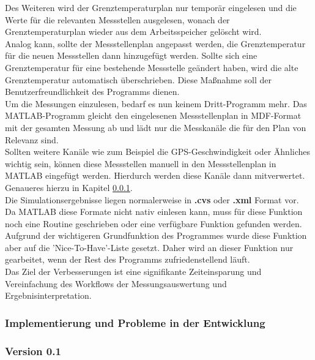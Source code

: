 Des Weiteren wird der Grenztemperaturplan nur temporär eingelesen und die Werte für die relevanten Messstellen ausgelesen, wonach der Grenztemperaturplan wieder aus dem Arbeitsspeicher gelöscht wird. \\
Analog kann, sollte der Messstellenplan angepasst werden, die Grenztemperatur für die neuen Messstellen dann hinzugefügt werden. Sollte sich eine Grenztemperatur für eine bestehende Messstelle geändert haben, wird die alte Grenztemperatur automatisch überschrieben. Diese Maßnahme soll der Benutzerfreundlichkeit des Programms dienen. \\

Um die Messungen einzulesen, bedarf es nun keinem Dritt-Programm mehr. Das MATLAB-Programm gleicht den eingelesenen Messstellenplan in MDF-Format mit der gesamten Messung ab und lädt nur die Messkanäle die für den Plan von Relevanz sind.\\
Sollten weitere Kanäle wie zum Beispiel die GPS-Geschwindigkeit oder Ähnliches wichtig sein, können diese Messstellen manuell in den Messstellenplan in MATLAB eingefügt werden. Hierdurch werden diese Kanäle dann mitverwertet. \\
Genaueres hierzu in Kapitel \ref{Implementierung}.\\

Die Simulationsergebnisse liegen normalerweise in \textbf{.cvs} oder \textbf{.xml} Format vor. \\
Da MATLAB diese Formate nicht nativ einlesen kann, muss für diese Funktion noch eine Routine geschrieben oder eine verfügbare Funktion gefunden werden.\\
Aufgrund der wichtigeren Grundfunktion des Programmes wurde diese Funktion aber auf die 'Nice-To-Have'-Liste gesetzt. Daher wird an dieser Funktion nur gearbeitet, wenn der Rest des Programms zufriedenstellend läuft.\\

Das Ziel der Verbesserungen ist eine signifikante Zeiteinsparung und Vereinfachung des Workflows der Messungsauswertung und Ergebnisinterpretation.\\

\subsubsection{Implementierung und Probleme in der Entwicklung}
\label{Implementierung}
\subsubsection*{Version 0.1}


